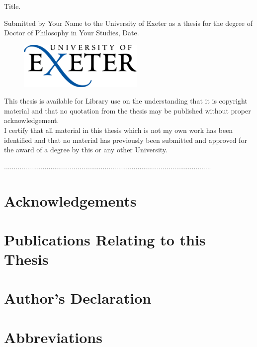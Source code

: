 \documentclass[12pt,a4paper,twoside]{report}
\begin{document}
\begin{center}
{\Large Title.}
\vspace{6mm}

{Submitted by Your Name to the University of Exeter as a thesis for the degree of Doctor of Philosophy in Your Studies, Date.
\vspace{6mm}}

\begin{figure}[h]
\centering
\includegraphics[width=60mm]{images/UoE_logo.png}
\end{figure}

This thesis is available for Library use on the understanding that it is copyright material and that no quotation from the thesis may be published without proper acknowledgement.\\
\vspace{6mm}
I certify that all material in this thesis which is not my own work has been identified and that no material has previously been submitted and approved for the award of a degree by this or any other University.\\
\vspace{16mm}

...........................................................................................................
\end{center}

\begin{abstract}

\end{abstract}
\section*{Acknowledgements}

\clearpage
\section*{Publications Relating to this Thesis}

\clearpage
\section*{Author's Declaration}

\clearpage
\section*{Abbreviations}

\clearpage
\end{document}
